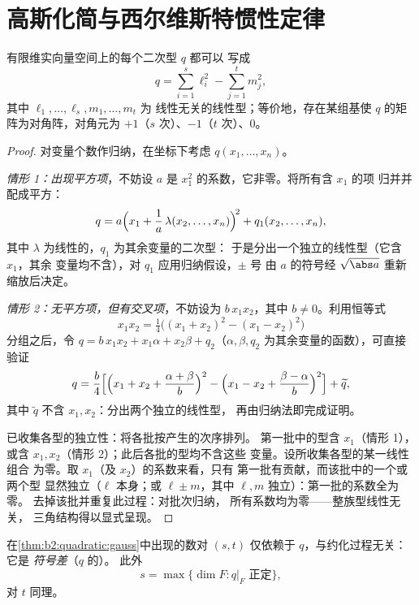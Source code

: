 \section{高斯化简与西尔维斯特惯性定律}

\begin{theorem}[高斯化简]\label{thm:b2:quadratic:gauss}
有限维实向量空间上的每个二次型 $q$ 都可以
写成
\[
q = \sum_{i=1}^{s} \ell_i^2 - \sum_{j=1}^{t} m_j^2 ,
\]
其中 $\ell_1, \dots, \ell_s, m_1, \dots, m_t$ 为
线性无关的线性型；等价地，存在某组基使
$q$ 的矩阵为对角阵，对角元为 $+1$（$s$ 次）、$-1$（$t$
次）、$0$。
\end{theorem}

\begin{proof}
对变量个数作归纳，在坐标下考虑 $q(x_1,
\dots, x_n)$。

\emph{情形 1：出现平方项}，不妨设 $a$ 是
$x_1^2$ 的系数，它非零。将所有含 $x_1$ 的项
归并并配成平方：
\[
q = a\Bigl(x_1 + \frac{1}{a}\,\lambda(x_2, \dots,
x_n)\Bigr)^{\!2} + q_1(x_2, \dots, x_n),
\]
其中 $\lambda$ 为线性的，$q_1$ 为其余变量的二次型：
于是分出一个独立的线性型（它含 $x_1$，其余
变量均不含），对 $q_1$ 应用归纳假设，$\pm$ 号
由 $a$ 的符号经 $\sqrt{\abs a}$ 重新缩放后决定。

\emph{情形 2：无平方项，但有交叉项}，不妨设为 $b\,x_1x_2$，其中
$b \neq 0$。利用恒等式
\[
x_1x_2 = \tfrac14\bigl((x_1 + x_2)^2 - (x_1 - x_2)^2\bigr)
\]
分组之后，令 $q = b\,x_1x_2 + x_1\alpha + x_2\beta +
q_2$（$\alpha, \beta, q_2$ 为其余变量的函数），可直接验证
\[
q = \frac{b}{4}\Bigl[\Bigl(x_1 + x_2 + \frac{\alpha +
\beta}{b}\Bigr)^{2} - \Bigl(x_1 - x_2 + \frac{\beta -
\alpha}{b}\Bigr)^{2}\Bigr] + \widetilde q ,
\]
其中 $\widetilde q$ 不含 $x_1, x_2$：分出两个独立的线性型，
再由归纳法即完成证明。

已收集各型的独立性：将各批按产生的次序排列。
第一批中的型含 $x_1$（情形 1），
或含 $x_1, x_2$（情形 2）；此后各批的型均不含这些
变量。设所收集各型的某一线性组合
为零。取 $x_1$（及 $x_2$）的系数来看，只有
第一批有贡献，而该批中的一个或两个型
显然独立（$\ell$ 本身；或 $\ell \pm
m$，其中 $\ell, m$ 独立）：第一批的系数全为零。
去掉该批并重复此过程：对批次归纳，
所有系数均为零——整族型线性无关，
三角结构得以显式呈现。
\end{proof}

\begin{theorem}[西尔维斯特惯性定律]\label{thm:b2:quadratic:sylvester}
在\cref{thm:b2:quadratic:gauss}中出现的数对 $(s, t)$ 仅依赖于
$q$，与约化过程无关：它是
\emph{符号差}（$q$ 的）。
此外
\[
s = \max\{\dim F : q|_F \text{ 正定}\},
\]
对 $t$ 同理。
\end{theorem}


